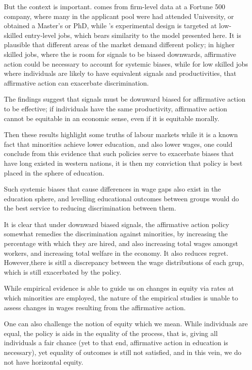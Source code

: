 \documentclass[]{article}
\begin{document}
But the context is important. \citet{LiRaymondBergman2020} comes from firm-level data at a Fortune 500 company, where many in the applicant pool were had attended University, or obtained a Master's or PhD, while \citet{aganstarr2018}'s experimental design is targeted at low-skilled entry-level jobs, which bears similarity to the model presented here. It is plausible that different areas of the market demand different policy; in higher skilled jobs, where the is room for signals to be biased downwards, affirmative action could be necessary to account for systemic biases, while for low skilled jobs where individuals are likely to have equivalent signals and productivities, that affirmative action can exacerbate discrimination. 

The findings suggest that signals must be downward biased for affirmative action to be effective; if individuals have the same productivity, affirmative action cannot be equitable in an economic sense, even if it is equitable morally. 

 Then these results highlight some truths of labour markets while it is a known fact that minorities achieve lower education, and also lower wages, one could conclude from this evidence that such policies serve to exacerbate biases that have long existed in western nations, it is then my conviction that policy is best placed in the sphere of education.

Such systemic biases that cause differences in wage gaps also exist in the education sphere, and levelling educational outcomes between groups would do the best service to reducing discrimination between them. 

It is clear that under downward biased signals, the affirmative action policy somewhat remedies the discrimination against minorities, by increasing the percentage with which they are hired, and also increasing total wages amongst workers, and increasing total welfare in the economy. It also reduces regret. However,there is sitll a discrepancy between the wage distributions of each grup, which is still exacerbated by the policy.

While empirical evidence is able to guide us on changes in equity via rates at which minorities are employed, the nature of the empirical studies is unable to assess changes in wages resulting from the affirmative action.

One can also challenge the notion of equity which we mean. While individuals are equal, the policy is aids in the equality of the process, that is, giving all individuals a fair chance (yet to that end, affirmative action in education is necessary), yet equality of outcomes is still not satisfied, and in this vein, we do not have horizontal equity.
\end{document}
